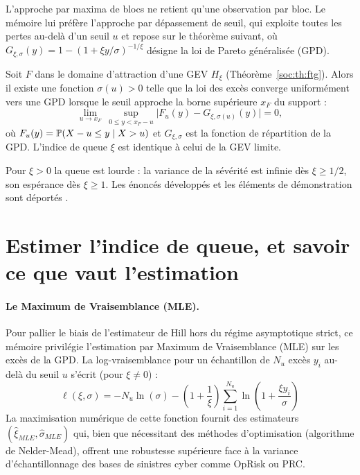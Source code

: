 \noindent L'approche par maxima de blocs ne retient qu'une observation par bloc. Le mémoire lui
préfère l'approche par dépassement de seuil, qui exploite toutes les pertes au-delà d'un seuil $u$
et repose sur le théorème suivant, où
$G_{\xi,\sigma}(y)=1-\left(1+\xi y/\sigma\right)^{-1/\xi}$ désigne la loi de Pareto
généralisée (GPD).

\begin{theorem}\label{soc:th:balkema}
Soit $F$ dans le domaine d'attraction d'une GEV $H_\xi$ (Théorème~\ref{soc:th:ftg}). Alors il existe une fonction $\sigma(u)>0$ telle que la loi des excès converge uniformément vers une GPD lorsque le seuil approche la borne supérieure $x_F$ du support :
\begin{equation}
\lim_{u\to x_F}\ \sup_{0\le y< x_F-u}\bigl|F_u(y)-G_{\xi,\sigma(u)}(y)\bigr|=0,
\end{equation}
où $F_u(y)=\mathbb{P}(X-u\le y\mid X>u)$ et $G_{\xi,\sigma}$ est la fonction de répartition de la GPD. L'indice de queue $\xi$ est identique à celui de la GEV limite.
\end{theorem}

\noindent Pour $\xi>0$ la queue est lourde : la variance de la sévérité est infinie dès
$\xi\ge 1/2$, son espérance dès $\xi\ge 1$. Les énoncés développés et les éléments de
démonstration sont déportés \matcomp.

\section{Estimer l'indice de queue, et savoir ce que vaut l'estimation}


\paragraph{Le Maximum de Vraisemblance (MLE).}
Pour pallier le biais de l'estimateur de Hill hors du régime asymptotique strict, ce mémoire privilégie l'estimation par Maximum de Vraisemblance (MLE) sur les excès de la GPD. La log-vraisemblance pour un échantillon de $N_u$ excès $y_i$ au-delà du seuil $u$ s'écrit (pour $\xi \neq 0$) :
\begin{equation}
\ell(\xi, \sigma) = -N_u \ln(\sigma) - \left(1 + \frac{1}{\xi}\right) \sum_{i=1}^{N_u} \ln\left(1 + \frac{\xi y_i}{\sigma}\right)
\label{soc:eq:loglik-gpd}
\end{equation}
La maximisation numérique de cette fonction fournit des estimateurs $(\hat{\xi}_{MLE}, \hat{\sigma}_{MLE})$ qui, bien que nécessitant des méthodes d'optimisation (algorithme de Nelder-Mead), offrent une robustesse supérieure face à la variance d'échantillonnage des bases de sinistres cyber comme OpRisk ou PRC.

